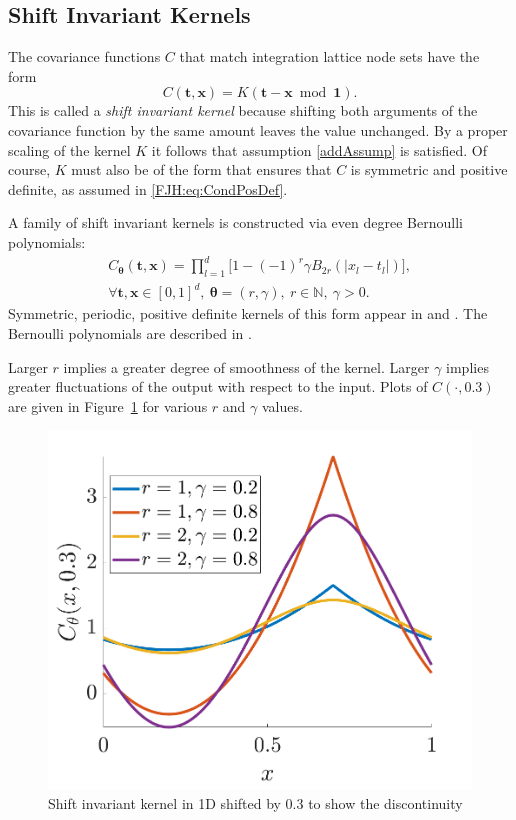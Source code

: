 \documentclass[twocolumn]{svjour3}          %
\newcommand{\bm}[1]{\boldsymbol{#1}}
\newcommand{\naturals}{\mathbb{N}}
\newcommand{\vtheta}{{\bm{\theta}}}
\newcommand{\vt}{\bm{t}}
\newcommand{\vx}{\bm{x}}
\newcommand{\vone}{\bm{1}}
\newcommand\figref{Figure~\ref}
\begin{document}
\subsection{Shift Invariant Kernels}
The covariance functions $C$ that match integration lattice node sets have the form
\begin{equation} \label{eq:shInv}
C(\vt,\vx) = K(\vt - \vx \bmod \vone).
\end{equation}
This is called a \emph{shift invariant kernel} because shifting both arguments of the covariance function by the same amount leaves the value unchanged.   By a proper scaling of the kernel $K$ it follows that assumption \eqref{addAssump} is satisfied. Of course, $K$ must also be of the form that ensures that $C$ is symmetric and positive definite, as assumed in \eqref{FJH:eq:CondPosDef}. 

A family of shift invariant kernels is constructed via even degree Bernoulli polynomials:
\begin{multline}
\label{the_kernel_eqn_bernoulli}
C_\vtheta(\vt, \vx) =
\prod_{l=1}^d \biggl[
1 - (-1)^{r} \gamma B_{2r}( |{x_l-t_l}| ) \biggr], \\  
\forall \vt,\vx \in [0,1]^d, \  \vtheta = (r,\gamma), \ r \in \naturals, \ \gamma > 0.
\end{multline}
Symmetric, periodic, positive definite kernels of this form appear in  \cite{DicEtal14a} and \cite{Hic96a}.  The Bernoulli polynomials are described in \cite[Chapter 24]{OlvEtal10a}.

Larger $r$ implies a greater degree of smoothness of the kernel.  Larger $\gamma$ implies greater fluctuations of the output with respect to the input.  Plots of $C(\cdot, 0.3)$ are given in \figref{fig:fourierkernel-dim1} for various $r$ and $\gamma$ values.

\begin{figure}
	\centering
	\includegraphics[width=0.9\linewidth]{"figures/fourier_kernel dim_1"}
	\caption[Fourier kernel]{Shift invariant kernel in 1D shifted by 0.3 to show the discontinuity }
	\label{fig:fourierkernel-dim1}
\end{figure}
\end{document}
